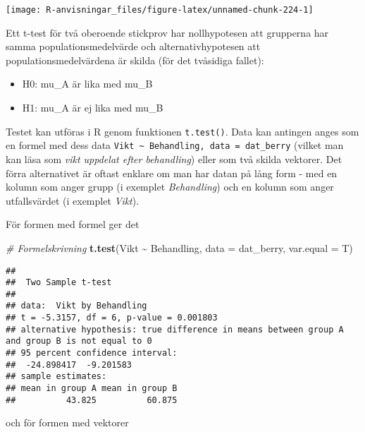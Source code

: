 \documentclass[
]{book}
\newenvironment{Shaded}{\begin{snugshade}}{\end{snugshade}}
\newcommand{\AttributeTok}[1]{\textcolor[rgb]{0.13,0.29,0.53}{#1}}
\newcommand{\CommentTok}[1]{\textcolor[rgb]{0.56,0.35,0.01}{\textit{#1}}}
\newcommand{\FunctionTok}[1]{\textcolor[rgb]{0.13,0.29,0.53}{\textbf{#1}}}
\newcommand{\NormalTok}[1]{#1}
\newcommand{\SpecialCharTok}[1]{\textcolor[rgb]{0.81,0.36,0.00}{\textbf{#1}}}
\providecommand{\tightlist}{%
  \setlength{\itemsep}{0pt}\setlength{\parskip}{0pt}}
\theoremstyle{definition}
\theoremstyle{definition}
\theoremstyle{definition}
\theoremstyle{definition}
\theoremstyle{remark}
\begin{document}
\begin{center}\texttt{[image: R-anvisningar\_files/figure-latex/unnamed-chunk-224-1]} \end{center}

Ett t-test för två oberoende stickprov har nollhypotesen att grupperna har samma populationsmedelvärde och alternativhypotesen att populationsmedelvärdena är skilda (för det tvåsidiga fallet):

\begin{itemize}
\tightlist
\item
  H0: mu\_A är lika med mu\_B
\item
  H1: mu\_A är ej lika med mu\_B
\end{itemize}

Testet kan utföras i R genom funktionen \texttt{t.test()}. Data kan antingen anges som en formel med dess data \texttt{Vikt\ \textasciitilde{}\ Behandling,\ data\ =\ dat\_berry} (vilket man kan läsa som \emph{vikt uppdelat efter behandling}) eller som två skilda vektorer. Det förra alternativet är oftast enklare om man har datan på lång form - med en kolumn som anger grupp (i exemplet \emph{Behandling}) och en kolumn som anger utfallsvärdet (i exemplet \emph{Vikt}).

För formen med formel ger det

\begin{Shaded}
\begin{Highlighting}[]
\CommentTok{\# Formelskrivning}
\FunctionTok{t.test}\NormalTok{(Vikt }\SpecialCharTok{\textasciitilde{}}\NormalTok{ Behandling, }\AttributeTok{data =}\NormalTok{ dat\_berry, }\AttributeTok{var.equal =}\NormalTok{ T)}
\end{Highlighting}
\end{Shaded}

\begin{verbatim}
## 
##  Two Sample t-test
## 
## data:  Vikt by Behandling
## t = -5.3157, df = 6, p-value = 0.001803
## alternative hypothesis: true difference in means between group A and group B is not equal to 0
## 95 percent confidence interval:
##  -24.898417  -9.201583
## sample estimates:
## mean in group A mean in group B 
##          43.825          60.875
\end{verbatim}

och för formen med vektorer
\end{document}
